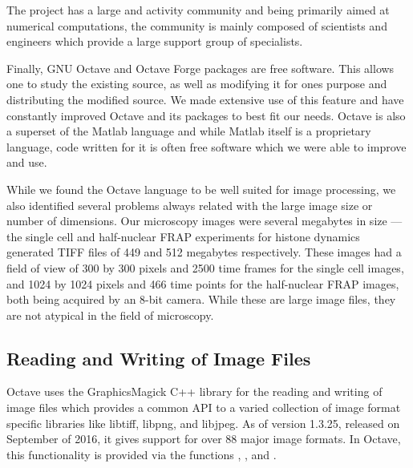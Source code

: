 The project has a large and activity community and being primarily
aimed at numerical computations, the community is mainly composed of
scientists and engineers which provide a large support group of
specialists.

Finally, GNU Octave and Octave Forge packages are free software.  This
allows one to study the existing source, as well as modifying it for
ones purpose and distributing the modified source.  We made extensive
use of this feature and have constantly improved Octave and its
packages to best fit our needs.  Octave is also a superset of the
Matlab language and while Matlab itself is a proprietary language,
code written for it is often free software which we were able to
improve and use.

While we found the Octave language to be well suited for image
processing, we also identified several problems always related with
the large image size or number of dimensions.  Our microscopy images
were several megabytes in size --- the single cell and half-nuclear
FRAP experiments for histone dynamics generated TIFF files of 449 and
512 megabytes respectively.  These images had a field of view of 300
by 300 pixels and 2500 time frames for the single cell images, and
1024 by 1024 pixels and 466 time points for the half-nuclear FRAP
images, both being acquired by an 8-bit camera.  While these are large
image files, they are not atypical in the field of microscopy.

\subsection{Reading and Writing of Image Files}

Octave uses the GraphicsMagick C++ library for the reading and writing
of image files which provides a common API to a varied collection of
image format specific libraries like libtiff, libpng, and libjpeg.  As
of version 1.3.25, released on September of 2016, it gives support for
over 88 major image formats.  In Octave, this functionality is
provided via the functions , , and
.

